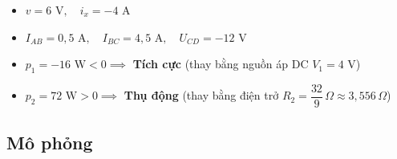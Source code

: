 \begin{dapsobox}
  \begin{itemize}[leftmargin=1.5em]
    \item $v = 6\text{ V}, \quad i_x = -4\text{ A}$
    \item $I_{AB} = 0{,}5\text{ A}, \quad I_{BC} = 4{,}5\text{ A}, \quad U_{CD} = -12\text{ V}$
    \item $p_1 = -16\text{ W} < 0 \implies$ \textbf{Tích cực} (thay bằng nguồn áp DC $V_1 = 4\text{ V}$)
    \item $p_2 = 72\text{ W} > 0 \implies$ \textbf{Thụ động} (thay bằng điện trở $R_2 = \dfrac{32}{9}\,\Omega \approx 3{,}556\,\Omega$)
  \end{itemize}
\end{dapsobox}

\subsection{Mô phỏng}
\simresult
{}
